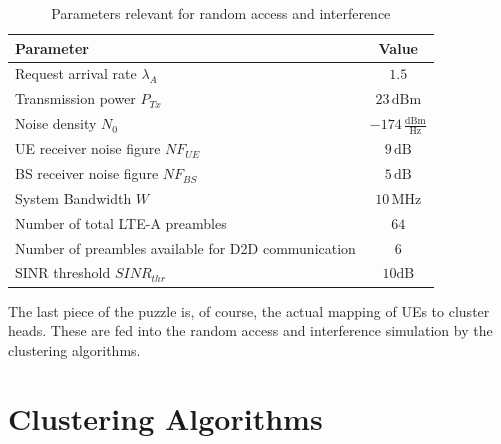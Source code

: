 \begin{table}[H]
\begin{center}
 \begin{tabular}{||p{10cm}|p{2.5cm}||} 
 \hline
 \textbf{Parameter} & \multicolumn{1}{|c||}{\textbf{Value}}\\
 \hline\hline
 Request arrival rate $\lambda_A$ & \multicolumn{1}{|c||}{$1.5$} \\ 
 \hline
 Transmission power $P_{Tx}$& \multicolumn{1}{|c||}{$23\,\text{dBm}$} \\
 \hline
 Noise density $N_0$ & \multicolumn{1}{|c||}{$-174\,\frac{\text{dBm}}{\text{Hz}}$}\\
 \hline
 UE receiver noise figure $NF_{UE}$ & \multicolumn{1}{|c||}{$9\,\text{dB}$}\\
 \hline
 BS receiver noise figure $NF_{BS}$ & \multicolumn{1}{|c||}{$5\,\text{dB}$} \\
 \hline
 System Bandwidth $W$ & \multicolumn{1}{|c||}{$10\,\text{MHz}$} \\
 \hline
 Number of total LTE-A preambles & \multicolumn{1}{|c||}{$64$} \\
 \hline
 Number of preambles available for D2D communication& \multicolumn{1}{|c||}{$6$}\\
 \hline
 SINR threshold $SINR_{thr}$ & \multicolumn{1}{|c||}{$10\text{dB}$}\\
 \hline
\end{tabular}
\end{center}
\caption{Parameters relevant for random access and interference}
\label{tbl:RA}
\end{table}

The last piece of the puzzle is, of course, the actual mapping of UEs to cluster heads. These are fed into the random access and interference simulation by the clustering algorithms.

\section{Clustering Algorithms}